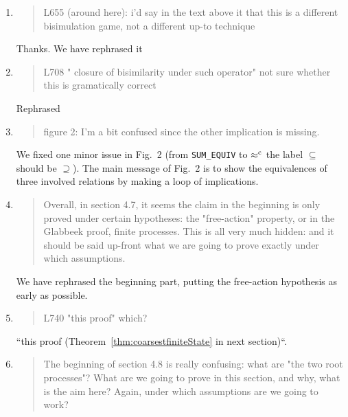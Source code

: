 \begin{enumerate}
\item \begin{quote}
    L655 (around here): i'd say in the text above it that this is a
    different bisimulation game, not a different up-to technique
  \end{quote}
  \Mark
  Thanks. We have rephrased it 
\item \begin{quote}
    L708 " closure of bisimilarity under such operator" not sure whether this is gramatically correct
  \end{quote}
  \Mark
  Rephrased

\item \begin{quote}
    figure 2: I'm a bit confused since the other implication is missing. 
  \end{quote}
  \Mark
  We fixed one minor issue in Fig.~2 (from \texttt{SUM_EQUIV} to
  $\mathrel{\approx^{\rm{c}}}$ the label $\subseteq$ should be $\supseteq$). The main
  message of Fig.~2 is to show the equivalences of three involved
  relations by making a loop of implications.
  
\item \begin{quote}
    Overall, in section 4.7, it seems the claim in the beginning is
    only proved under certain hypotheses: the "free-action" property,
    or in the Glabbeek proof, finite processes. This is all very much
    hidden: and it should be said up-front what we are going to prove
    exactly under which assumptions.
  \end{quote}

  \Mark
  We have rephrased the beginning part, putting the free-action
  hypothesis as early as possible.
  
\item \begin{quote}
    L740 "this proof" which? 
  \end{quote}

  \Mark
  ``this proof (Theorem~\ref{thm:coarsestfiniteState} in next
  section)``.
  
\item \begin{quote}
    The beginning of section 4.8 is really confusing: what are "the
    two root processes"? What are we going to prove in this section,
    and why, what is the aim here? Again, under which assumptions are
    we going to work?
  \end{quote}


\end{enumerate}
